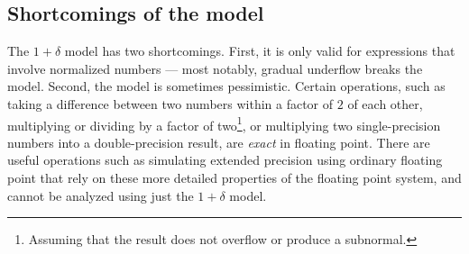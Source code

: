 \subsection{Shortcomings of the model}

The $1+\delta$ model has two shortcomings.  First, it is only valid
for expressions that involve normalized numbers --- most notably,
gradual underflow breaks the model.  Second, the model is sometimes
pessimistic.  Certain operations, such as taking a difference between
two numbers within a factor of $2$ of each other, multiplying or
dividing by a factor of two\footnote{Assuming that the result
does not overflow or produce a subnormal.}, or multiplying two
single-precision numbers into a double-precision result,
are {\em exact} in floating point.  There are useful operations
such as simulating extended precision using ordinary floating point
that rely on these more detailed properties of the floating point system,
and cannot be analyzed using just the $1+\delta$ model.
